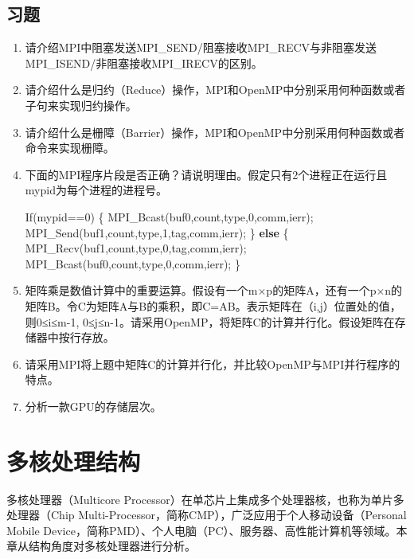 \documentclass[]{ctexbook}
\newenvironment{Shaded}{\begin{snugshade}}{\end{snugshade}}
\newcommand{\ControlFlowTok}[1]{\textcolor[rgb]{0.13,0.29,0.53}{\textbf{#1}}}
\newcommand{\DecValTok}[1]{\textcolor[rgb]{0.00,0.00,0.81}{#1}}
\newcommand{\NormalTok}[1]{#1}
\begin{document}
\hypertarget{ux4e60ux9898-9}{%
\section{习题}\label{ux4e60ux9898-9}}

\begin{enumerate}
\def\labelenumi{\arabic{enumi}.}
\item
  请介绍MPI中阻塞发送MPI\_SEND/阻塞接收MPI\_RECV与非阻塞发送MPI\_ISEND/非阻塞接收MPI\_IRECV的区别。
\item
  请介绍什么是归约（Reduce）操作，MPI和OpenMP中分别采用何种函数或者子句来实现归约操作。
\item
  请介绍什么是栅障（Barrier）操作，MPI和OpenMP中分别采用何种函数或者命令来实现栅障。
\item
  下面的MPI程序片段是否正确？请说明理由。假定只有2个进程正在运行且mypid为每个进程的进程号。

\begin{Shaded}
\begin{Highlighting}[]
\NormalTok{If(mypid==}\DecValTok{0}\NormalTok{) \{}
\NormalTok{    MPI\_Bcast(buf0,count,type,}\DecValTok{0}\NormalTok{,comm,ierr);}
\NormalTok{    MPI\_Send(buf1,count,type,}\DecValTok{1}\NormalTok{,tag,comm,ierr);}
\NormalTok{\} }\ControlFlowTok{else}\NormalTok{ \{}
\NormalTok{    MPI\_Recv(buf1,count,type,}\DecValTok{0}\NormalTok{,tag,comm,ierr);}
\NormalTok{    MPI\_Bcast(buf0,count,type,}\DecValTok{0}\NormalTok{,comm,ierr);}
\NormalTok{\}}
\end{Highlighting}
\end{Shaded}
\item
  矩阵乘是数值计算中的重要运算。假设有一个m×p的矩阵A，还有一个p×n的矩阵B。令C为矩阵A与B的乘积，即C=AB。表示矩阵在（i,j）位置处的值，则0≤i≤m-1, 0≤j≤n-1。请采用OpenMP，将矩阵C的计算并行化。假设矩阵在存储器中按行存放。
\item
  请采用MPI将上题中矩阵C的计算并行化，并比较OpenMP与MPI并行程序的特点。
\item
  分析一款GPU的存储层次。
\end{enumerate}

\newpage

\hypertarget{ux591aux6838ux5904ux7406ux7ed3ux6784}{%
\chapter{多核处理结构}\label{ux591aux6838ux5904ux7406ux7ed3ux6784}}

多核处理器（Multicore Processor）在单芯片上集成多个处理器核，也称为单片多处理器（Chip Multi-Processor，简称CMP），广泛应用于个人移动设备（Personal Mobile Device，简称PMD）、个人电脑（PC）、服务器、高性能计算机等领域。本章从结构角度对多核处理器进行分析。
\end{document}
